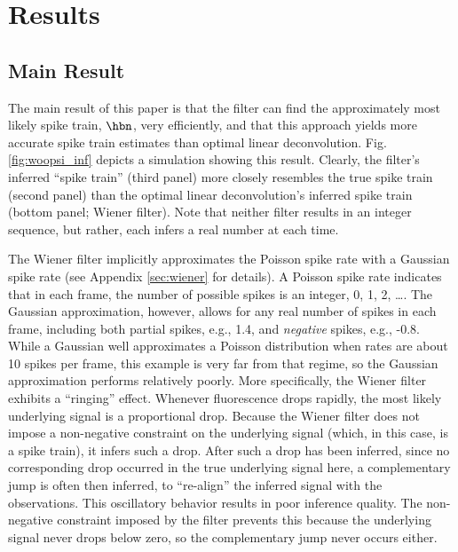 \section{Results} \label{sec:results}

\subsection{Main Result} \label{sec:main}

The main result of this paper is that the \foopsi filter can find the approximately most likely spike train, $\hbn$, very efficiently, and that this approach yields more accurate spike train estimates than optimal linear deconvolution.  Fig. \ref{fig:woopsi_inf} depicts a simulation showing this result. Clearly, the \foopsi filter's inferred ``spike train'' (third panel) more closely resembles the true spike train (second panel) than the optimal linear deconvolution's inferred spike train (bottom panel; Wiener filter).  Note that neither filter results in an integer sequence, but rather, each infers a real number at each time.

The Wiener filter implicitly approximates the Poisson spike rate with a Gaussian spike rate (see Appendix \ref{sec:wiener} for details).  A Poisson spike rate indicates that in each frame, the number of possible spikes is an integer, 0, 1, 2, \ldots.  The Gaussian approximation, however, allows for any real number of spikes in each frame, including both partial spikes, e.g., 1.4, and \emph{negative} spikes, e.g., -0.8.  While a Gaussian well approximates a Poisson distribution when rates are about 10 spikes per frame, this example is very far from that regime, so the Gaussian approximation performs relatively poorly.  More specifically, the Wiener filter exhibits a ``ringing'' effect.  Whenever fluorescence drops rapidly, the most likely underlying signal is a proportional drop.  Because the Wiener filter does not impose a non-negative constraint on the underlying signal (which, in this case, is a spike train), it infers such a drop.  After such a drop has been inferred, since no corresponding drop occurred in the true underlying signal here, a complementary jump is often then inferred, to ``re-align'' the inferred signal with the observations.  This oscillatory behavior results in poor inference quality. The non-negative constraint imposed by the \foopsi filter prevents this because the underlying signal never drops below zero, so the complementary jump never occurs either.


